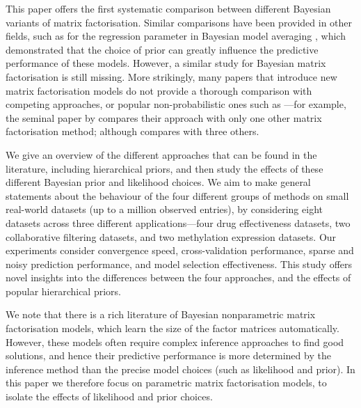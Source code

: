 \documentclass[letterpaper]{article} %
\begin{document}
	This paper offers the first systematic comparison between different Bayesian variants of matrix factorisation. Similar comparisons have been provided in other fields, such as for the regression parameter in Bayesian model averaging \cite{Ley2009,Eicher2011}, which demonstrated that the choice of prior can greatly influence the predictive performance of these models. However, a similar study for Bayesian matrix factorisation is still missing. More strikingly, many papers that introduce new matrix factorisation models do not provide a thorough comparison with competing approaches, or popular non-probabilistic ones such as \cite{Lee2000}---for example, the seminal paper by \cite{Salakhutdinov2008} compares their approach with only one other matrix factorisation method; although \cite{Gopalan2015} compares with three others.
	
	We give an overview of the different approaches that can be found in the literature, including hierarchical priors, and then study the effects of these different Bayesian prior and likelihood choices. 
	We aim to make general statements about the behaviour of the four different groups of methods on small real-world datasets (up to a million observed entries), by considering eight datasets across three different applications---four drug effectiveness datasets, two collaborative filtering datasets, and two methylation expression datasets. Our experiments consider convergence speed, cross-validation performance, sparse and noisy prediction performance, and model selection effectiveness. 
	This study offers novel insights into the differences between the four approaches, and the effects of popular hierarchical priors. 
	
	
	We note that there is a rich literature of Bayesian nonparametric matrix factorisation models, which learn the size of the factor matrices automatically. However, these models often require complex inference approaches to find good solutions, and hence their predictive performance is more determined by the inference method than the precise model choices (such as likelihood and prior). In this paper we therefore focus on parametric matrix factorisation models, to isolate the effects of likelihood and prior choices.
	
\end{document}
